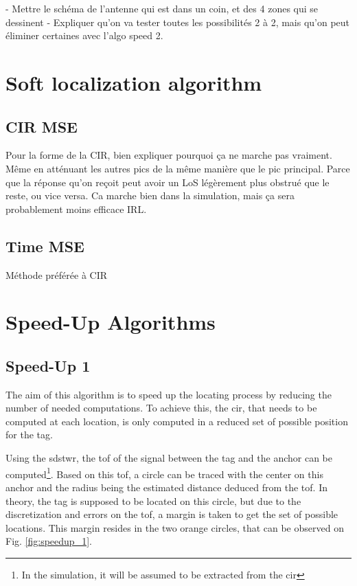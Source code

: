 - Mettre le schéma de l'antenne qui est dans un coin, et des 4 zones qui se dessinent
- Expliquer qu'on va tester toutes les possibilités 2 à 2, mais qu'on peut éliminer certaines avec l'algo speed 2.

\section{Soft localization algorithm}
\label{soft_loc}

\subsection{CIR MSE}

Pour la forme de la CIR, bien expliquer pourquoi ça ne marche pas vraiment. Même en atténuant les autres pics de la même manière que le pic principal. Parce que la réponse qu'on reçoit peut avoir un LoS légèrement plus obstrué que le reste, ou vice versa. Ca marche bien dans la simulation, mais ça sera probablement moins efficace IRL.

\subsection{Time MSE}

Méthode préférée à CIR

\section{Speed-Up Algorithms}
\label{speed-up}
\subsection{Speed-Up 1}

The aim of this algorithm is to speed up the locating process by reducing the number of needed computations. To achieve this, the \gls{cir}, that needs to be computed at each location, is only computed in a reduced set of possible position for the tag.
\vspace{2mm}

Using the \gls{sdstwr}, the \gls{tof} of the signal between the tag and the anchor can be computed\footnote{In the simulation, it will be assumed to be extracted from the \gls{cir}}. Based on this \gls{tof}, a circle can be traced with the center on this anchor and the radius being the estimated distance deduced from the \gls{tof}. In theory, the tag is supposed to be located on this circle, but due to the discretization and errors on the \gls{tof}, a margin is taken to get the set of possible locations. This margin resides in the two orange circles, that can be observed on Fig. \ref{fig:speedup_1}.
\vspace{2mm}

